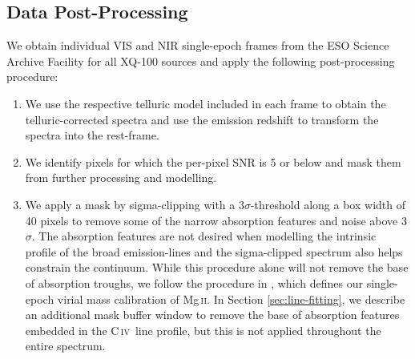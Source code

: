 \documentclass[fleqn,usenatbib]{mnras}
\newcommand{\mgii}{Mg\,\textsc{ii}}
\newcommand{\civ}{C\,\textsc{iv}}
\begin{document}
\subsection{Data Post-Processing} \label{sec:data-processing}
We obtain individual VIS and NIR single-epoch frames from the ESO Science Archive Facility for all XQ-100 sources and apply the following post-processing procedure:
\begin{enumerate}
    \item We use the respective telluric model included in each frame to obtain the telluric-corrected spectra and use the emission redshift to transform the spectra into the rest-frame.
    \item We identify pixels for which the per-pixel SNR is 5 or below and mask them from further processing and modelling.
    \item We apply a mask by sigma-clipping with a 3$\sigma$-threshold along a box width of 40 pixels to remove some of the narrow absorption features and noise above 3$\sigma$. The absorption features are not desired when modelling the intrinsic profile of the broad emission-lines and the sigma-clipped spectrum also helps constrain the continuum. While this procedure alone will not remove the base of absorption troughs, we follow the procedure in \citet{Shen_2011}, which defines our single-epoch virial mass calibration of \mgii. In Section \ref{sec:line-fitting}, we describe an additional mask buffer window to remove the base of absorption features embedded in the \civ\ line profile, but this is not applied throughout the entire spectrum.

\end{enumerate}
\end{document}
